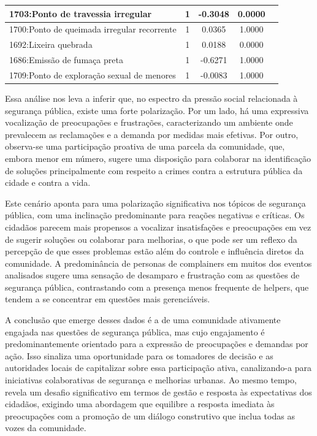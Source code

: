 \begin{table}[htbp]
\begin{tabular}{|l|c|c|c|c|}
		\hline
		1703:Ponto de travessia irregular           & 1                & -0.3048        & 0.0000           \\
		\hline
		1700:Ponto de queimada irregular recorrente & 1                & 0.0365         & 1.0000           \\
		\hline
		1692:Lixeira quebrada                       & 1                & 0.0188         & 0.0000           \\
		\hline
		1686:Emissão de fumaça preta                & 1                & -0.6271        & 1.0000           \\
		\hline
		1709:Ponto de exploração sexual de menores  & 1                & -0.0083        & 1.0000           \\
		\hline
	\end{tabular}
\end{table}

Essa análise nos leva a inferir que, no espectro da pressão social relacionada à segurança pública, existe uma forte polarização. Por um lado, há uma expressiva vocalização de preocupações e frustrações, caracterizando um ambiente onde prevalecem as reclamações e a demanda por medidas mais efetivas. Por outro, observa-se uma participação proativa de uma parcela da comunidade, que, embora menor em número, sugere uma disposição para colaborar na identificação de soluções principalmente com respeito a crimes contra a estrutura pública da cidade e contra a vida.

Este cenário aponta para uma polarização significativa nos tópicos de segurança pública, com uma inclinação predominante para reações negativas e críticas. Os cidadãos parecem mais propensos a vocalizar insatisfações e preocupações em vez de sugerir soluções ou colaborar para melhorias, o que pode ser um reflexo da percepção de que esses problemas estão além do controle e influência diretos da comunidade. A predominância de personas de complainers em muitos dos eventos analisados sugere uma sensação de desamparo e frustração com as questões de segurança pública, contrastando com a presença menos frequente de helpers, que tendem a se concentrar em questões mais gerenciáveis.

A conclusão que emerge desses dados é a de uma comunidade ativamente engajada nas questões de segurança pública, mas cujo engajamento é predominantemente orientado para a expressão de preocupações e demandas por ação. Isso sinaliza uma oportunidade para os tomadores de decisão e as autoridades locais de capitalizar sobre essa participação ativa, canalizando-a para iniciativas colaborativas de segurança e melhorias urbanas. Ao mesmo tempo, revela um desafio significativo em termos de gestão e resposta às expectativas dos cidadãos, exigindo uma abordagem que equilibre a resposta imediata às preocupações com a promoção de um diálogo construtivo que inclua todas as vozes da comunidade.

